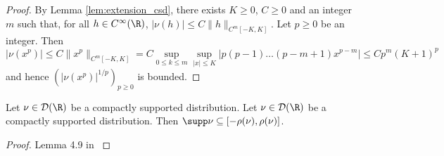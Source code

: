 \begin{proof}
  By Lemma \ref{lem:extension_csd}, there exists $K \geq 0$, $C \geq 0$ and an integer $m$
  such that, for all $h \in C^\infty(\R)$, $|\nu(h)| \leq C \|h\|_{C^m[-K,K]}$.
Let $p \geq 0$ be an integer.
Then
$$|\nu(x^p)| \leq C \|x^p\|_{C^m[-K,K]}
= C \sup_{0 \leq k \leq m} \sup_{|x| \leq K} |p(p-1) \ldots (p-m+1) x^{p-m}|
\leq C p^m (K+1)^p$$
and hence $(|\nu(x^p)|^{1/p})_{p \geq 0}$ is bounded.
\end{proof}

\begin{lemma}
  \label{lem:support_limsup}
  Let $\nu \in \mathcal{D}(\R)$ be a compactly supported distribution.
  Let $\nu \in \mathcal{D}(\R)$ be a compactly supported distribution.
  Then $\supp \nu \subseteq [-\rho(\nu), \rho(\nu)]$.
\end{lemma}

\begin{proof}
  Lemma 4.9 in \cite{chen2025}
\end{proof}
